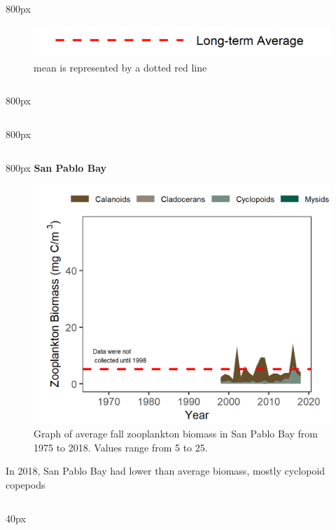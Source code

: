 \documentclass[
]{book}
\begin{document}
\begin{column}{800px\textwidth}
\begin{figure}
\includegraphics[width=15.25in]{figures/mline} \caption{mean is represented by a dotted red line}\label{fig:unnamed-chunk-114}
\end{figure}
\end{column}

\begin{column}{800px\textwidth}
\end{column}

\begin{column}{800px\textwidth}
\end{column}

\begin{column}{800px\textwidth}
\textbf{San Pablo Bay}

\begin{figure}
\includegraphics[width=15.25in]{figures/zoops_splfall} \caption{Graph of average fall zooplankton biomass in San Pablo Bay from 1975 to 2018. Values range from 5 to 25.}\label{fig:unnamed-chunk-115}
\end{figure}

In 2018, San Pablo Bay had lower than average biomass, mostly cyclopoid copepods
\end{column}

\begin{column}{40px\textwidth}
~
\end{column}
\end{document}
